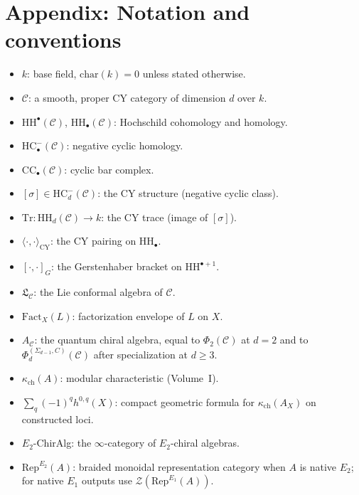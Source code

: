\documentclass[11pt]{article}
\theoremstyle{plain}
\theoremstyle{definition}
\theoremstyle{remark}
\newcommand{\Eone}{E_1}
\newcommand{\Etwo}{E_2}
\newcommand{\Rep}{\mathrm{Rep}}
\newcommand{\CY}{\mathrm{CY}}
\newcommand{\HH}{\mathrm{HH}}
\newcommand{\HC}{\mathrm{HC}}
\newcommand{\Tr}{\mathrm{Tr}}
\newcommand{\Fact}{\mathrm{Fact}}
\newcommand{\cC}{\mathcal{C}}
\newcommand{\cZ}{\mathcal{Z}}
\newcommand{\frakL}{\mathfrak{L}}
\begin{document}
\section{Appendix: Notation and conventions}
\label{sec:notation}

\begin{itemize}
\item $k$: base field, $\mathrm{char}(k) = 0$ unless stated otherwise.
\item $\cC$: a smooth, proper CY category of dimension $d$ over $k$.
\item $\HH^\bullet(\cC)$, $\HH_\bullet(\cC)$: Hochschild cohomology and homology.
\item $\HC^-_\bullet(\cC)$: negative cyclic homology.
\item $\mathrm{CC}_\bullet(\cC)$: cyclic bar complex.
\item $[\sigma] \in \HC^-_d(\cC)$: the CY structure (negative cyclic class).
\item $\Tr \colon \HH_d(\cC) \to k$: the CY trace (image of $[\sigma]$).
\item $\langle \cdot, \cdot \rangle_{\CY}$: the CY pairing on $\HH_\bullet$.
\item $[\cdot, \cdot]_G$: the Gerstenhaber bracket on $\HH^{\bullet+1}$.
\item $\frakL_\cC$: the Lie conformal algebra of $\cC$.
\item $\Fact_X(L)$: factorization envelope of $L$ on $X$.
\item $A_\cC$: the quantum chiral algebra, equal to $\Phi_2(\cC)$ at
$d=2$ and to $\Phi_d^{(\Sigma_{d-1},C)}(\cC)$ after specialization at
$d \geq 3$.
\item $\kappa_{\mathrm{ch}}(A)$: modular characteristic (Volume~I).
\item $\sum_q(-1)^q h^{0,q}(X)$: compact geometric formula for
$\kappa_{\mathrm{ch}}(A_X)$ on constructed loci.
\item $\Etwo$-ChirAlg: the $\infty$-category of $\Etwo$-chiral algebras.
\item $\Rep^{\Etwo}(A)$: braided monoidal representation category when
$A$ is native $\Etwo$; for native $\Eone$ outputs use
$\cZ(\Rep^{\Eone}(A))$.
\end{itemize}
\end{document}
